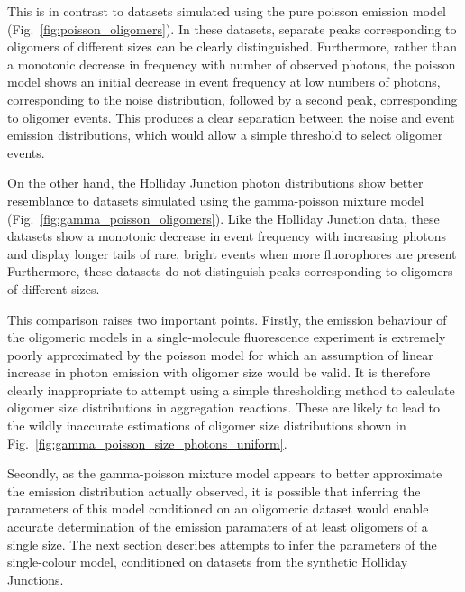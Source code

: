This is in contrast to datasets simulated using the pure poisson emission model (Fig.~\ref{fig:poisson_oligomers}). In these datasets, separate peaks corresponding to oligomers of different sizes can be clearly distinguished. Furthermore, rather than a monotonic decrease in frequency with number of observed photons, the poisson model shows an initial decrease in event frequency at low numbers of photons, corresponding to the noise distribution, followed by a second peak, corresponding to oligomer events. This produces a clear separation between the noise and event emission distributions, which would allow a simple threshold to select oligomer events. 

On the other hand, the Holliday Junction photon distributions show better resemblance to datasets simulated using the gamma-poisson mixture model (Fig.~\ref{fig:gamma_poisson_oligomers}). Like the Holliday Junction data, these datasets show a monotonic decrease in event frequency with increasing photons and display longer tails of rare, bright events when more fluorophores are present Furthermore, these datasets do not distinguish peaks corresponding to oligomers of different sizes. 

This comparison raises two important points. Firstly, the emission behaviour of the oligomeric models in a single-molecule fluorescence experiment is extremely poorly approximated by the poisson model for which an assumption of linear increase in photon emission with oligomer size would be valid. It is therefore clearly inappropriate to attempt using a simple thresholding method to calculate oligomer size distributions in aggregation reactions. These are likely to lead to the wildly inaccurate estimations of oligomer size distributions shown in Fig.~\ref{fig:gamma_poisson_size_photons_uniform}.

Secondly, as the gamma-poisson mixture model appears to better approximate the emission distribution actually observed, it is possible that inferring the parameters of this model conditioned on an oligomeric dataset would enable accurate determination of the emission paramaters of at least oligomers of a single size. The next section describes attempts to infer the parameters of the single-colour model, conditioned on datasets from the synthetic Holliday Junctions.  

